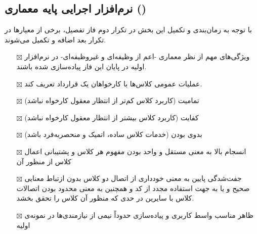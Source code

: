\subsection{\hspace*{0.2cm}نرم‌افزار اجرایی پایه معماری ()}
با توجه به زمان‌بندی و تکمیل این بخش در تکرار دوم فاز تفصیل، برخی از معیارها در تکرار بعد اضافه و تکمیل می‌شوند.

\begin{itemize} \setlength\itemsep{0cm}
	\item[$\boxtimes$]
	ویژگی‌های مهم از نظر معماری -اعم از وظیفه‌ای و غیروظیفه‌ای- در نرم‌افزار اولیه در پایان این فاز پیاده‌سازی شده باشند.
	\item[$\boxtimes$]
	عملیات عمومی کلاس‌ها با کارخواهان یک قرارداد تعریف کند.
	\item[$\boxtimes$]
	تمامیت (کاربرد کلاس کم‌تر از انتظار معقول کارخواه نباشد)
	\item[$\boxtimes$]
	کفایت (کاربرد کلاس بیشتر از انتظار معقول کارخواه نباشد)
	\item[$\boxtimes$]
	بدوی بودن (خدمات کلاس ساده، اتمیک و منحصربه‌فرد باشد)
	\item[$\boxtimes$]
	انسجام بالا به معنی مستقل و واحد بودن مفهوم هر کلاس و پشتیبانی اعمال کلاس از منظور آن
	\item[$\boxtimes$]
	جفت‌شدگی پایین به معنی خودداری از اتصال دو کلاس بدون ازتباط معنایی صحیح و یا به جهت استفاده مجدد از کد و همچنین به معنی محدود بودن اتصالات کلاس با سایرین در حدی که منظور آن کلاس را تحقق بخشد.
	\item[$\boxtimes$]
	ظاهر مناسب واسط کاربری و پیاده‌سازی حدوداً نیمی از نیازمندی‌ها در نمونه‌ی اولیه
\end{itemize}
